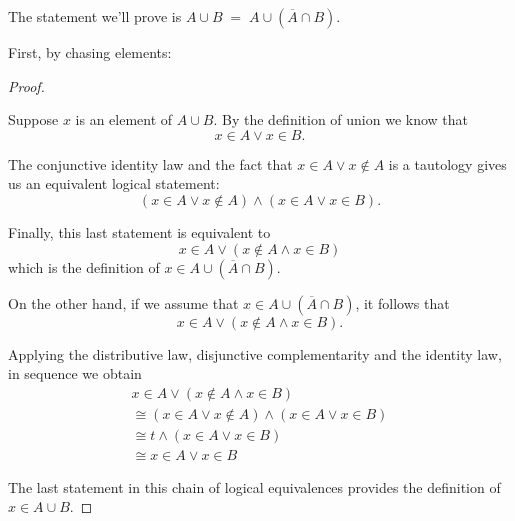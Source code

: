 \documentclass[10pt,]{book}
\theoremstyle{plain}
\theoremstyle{definition}
\theoremstyle{definition}
\numberwithin{equation}{section}
\begin{document}
    The statement we'll prove is \(A \cup B \; = \; A \cup (\overline{A} \cap B)\).
\par

    First, by chasing elements:
\begin{proof}\hypertarget{proof-23}{}

      Suppose \(x\) is an element of \(A \cup B\). By the definition of union we
      know that
      \begin{equation*}
        x \in A \lor x \in B.
      \end{equation*}
\par

      The conjunctive identity law and the
      fact that \(x \in A \lor x \notin A\) is a tautology gives us an equivalent
      logical statement:
      \begin{equation*}
        (x \in A \lor x \notin A) \land (x \in A \lor x \in B).
      \end{equation*}
\par

      Finally, this last statement is equivalent to
      \begin{equation*}
        x \in A \lor (x \notin A \land x \in B)
      \end{equation*}
      which is the definition of \(x \in A \cup (\overline{A} \cap B)\).
\par

      On the other hand, if we assume that \(x \in A \cup (\overline{A} \cap B)\), it follows that
      \begin{equation*}
        x \in A \lor (x \notin A \land x \in B).
      \end{equation*}
\par

      Applying the distributive law, disjunctive complementarity and the identity law,
      in sequence we obtain
      \begin{gather*}
x \in A \lor (x \notin A \land x \in B)\\
\cong (x \in A \lor x \notin A) \land (x \in A \lor x \in B)\\
\cong t \land (x \in A \lor x \in B)\\
\cong x \in A \lor x \in B
\end{gather*}
\par

      The last statement in this chain of logical equivalences provides the definition of \(x \in A \cup B\).
\end{proof}
\par
\end{document}
